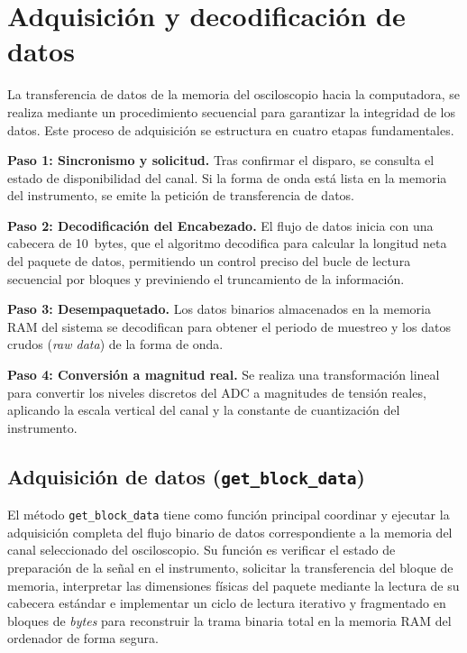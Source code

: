 \section{Adquisición y decodificación de datos}
La transferencia de datos de la memoria del osciloscopio hacia la computadora, se realiza mediante un procedimiento secuencial para garantizar la integridad de los datos.
Este proceso de adquisición se estructura en cuatro etapas fundamentales.\par
\textbf{Paso 1: Sincronismo y solicitud.} Tras confirmar el disparo, se consulta el estado de disponibilidad del canal. Si la forma de onda está lista en la memoria del instrumento, se emite la petición de transferencia de datos.\par
\textbf{Paso 2: Decodificación del Encabezado.} El flujo de datos inicia con una cabecera de \SI{10}{bytes}, que el algoritmo decodifica para calcular la longitud neta del paquete de datos, permitiendo un control preciso del bucle de lectura secuencial por bloques y previniendo el truncamiento de la información.\par
\textbf{Paso 3: Desempaquetado.} Los datos binarios almacenados en la memoria RAM del sistema se decodifican para obtener el periodo de muestreo y los datos crudos (\textit{raw data}) de la forma de onda.\par
\textbf{Paso 4: Conversión a magnitud real.} Se realiza una transformación lineal para convertir los niveles discretos del ADC a magnitudes de tensión reales, aplicando la escala vertical del canal y la constante de cuantización del instrumento.

\subsection{Adquisición de datos (\texttt{get\_block\_data})}
El método \texttt{get\_block\_data} tiene como función principal coordinar y ejecutar la adquisición completa del flujo binario de datos correspondiente a la memoria del canal seleccionado del osciloscopio. Su función es verificar el estado de preparación de la señal en el instrumento, solicitar la transferencia del bloque de memoria, interpretar las dimensiones físicas del paquete mediante la lectura de su cabecera estándar e implementar un ciclo de lectura iterativo y fragmentado en bloques de \textit{bytes} para reconstruir la trama binaria total en la memoria RAM del ordenador de forma segura.

